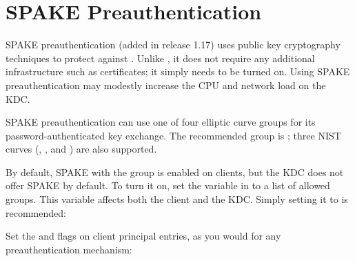 \documentclass[letterpaper,10pt,english]{sphinxmanual}
\begin{document}
\chapter{SPAKE Preauthentication}
\label{\detokenize{admin/spake::doc}}\label{\detokenize{admin/spake:spake-preauthentication}}\label{\detokenize{admin/spake:spake}}
SPAKE preauthentication (added in release 1.17) uses public key
cryptography techniques to protect against {\hyperref[\detokenize{admin/dictionary:dictionary}]{}}.  Unlike {\hyperref[\detokenize{admin/pkinit:pkinit}]{}}, it does not
require any additional infrastructure such as certificates; it simply
needs to be turned on.  Using SPAKE preauthentication may modestly
increase the CPU and network load on the KDC.

SPAKE preauthentication can use one of four elliptic curve groups for
its password-authenticated key exchange.  The recommended group is
; three NIST curves (, , and
) are also supported.

By default, SPAKE with the  group is enabled on
clients, but the KDC does not offer SPAKE by default.  To turn it on,
set the  variable in {\hyperref[\detokenize{admin/conf_files/krb5_conf:libdefaults}]{}} to a
list of allowed groups.  This variable affects both the client and the
KDC.  Simply setting it to  is recommended:

%
\begin{sphinxVerbatim}[commandchars=\\\{\}]
\PYG{p}{[}\PYG{p}{]}
      
\end{sphinxVerbatim}

Set the  and  flags on client
principal entries, as you would for any preauthentication mechanism:

%
\begin{sphinxVerbatim}[commandchars=\\\{\}]
    
\end{sphinxVerbatim}
\end{document}
